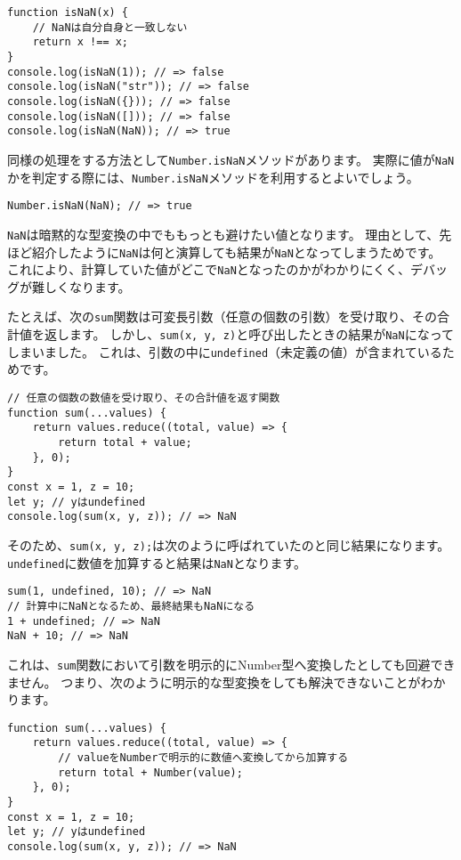 \begin{lstlisting}
function isNaN(x) {
    // NaNは自分自身と一致しない
    return x !== x;
}
console.log(isNaN(1)); // => false
console.log(isNaN("str")); // => false
console.log(isNaN({})); // => false
console.log(isNaN([])); // => false
console.log(isNaN(NaN)); // => true
\end{lstlisting}

同様の処理をする方法として\texttt{Number.isNaN}メソッドがあります。
実際に値が\texttt{NaN}かを判定する際には、\texttt{Number.isNaN}メソッドを利用するとよいでしょう。

\begin{lstlisting}
Number.isNaN(NaN); // => true
\end{lstlisting}

\texttt{NaN}は暗黙的な型変換の中でももっとも避けたい値となります。
理由として、先ほど紹介したように\texttt{NaN}は何と演算しても結果が\texttt{NaN}となってしまうためです。
これにより、計算していた値がどこで\texttt{NaN}となったのかがわかりにくく、デバッグが難しくなります。

たとえば、次の\texttt{sum}関数は可変長引数（任意の個数の引数）を受け取り、その合計値を返します。
しかし、\texttt{sum(x, y, z)}と呼び出したときの結果が\texttt{NaN}になってしまいました。
これは、引数の中に\texttt{undefined}（未定義の値）が含まれているためです。

\begin{lstlisting}
// 任意の個数の数値を受け取り、その合計値を返す関数
function sum(...values) {
    return values.reduce((total, value) => {
        return total + value;
    }, 0);
}
const x = 1, z = 10;
let y; // yはundefined
console.log(sum(x, y, z)); // => NaN
\end{lstlisting}

そのため、\texttt{sum(x, y, z);}は次のように呼ばれていたのと同じ結果になります。
\texttt{undefined}に数値を加算すると結果は\texttt{NaN}となります。

\begin{lstlisting}
sum(1, undefined, 10); // => NaN
// 計算中にNaNとなるため、最終結果もNaNになる
1 + undefined; // => NaN
NaN + 10; // => NaN
\end{lstlisting}

これは、\texttt{sum}関数において引数を明示的にNumber型へ変換したとしても回避できません。
つまり、次のように明示的な型変換をしても解決できないことがわかります。

\begin{lstlisting}
function sum(...values) {
    return values.reduce((total, value) => {
        // valueをNumberで明示的に数値へ変換してから加算する
        return total + Number(value);
    }, 0);
}
const x = 1, z = 10;
let y; // yはundefined
console.log(sum(x, y, z)); // => NaN
\end{lstlisting}

